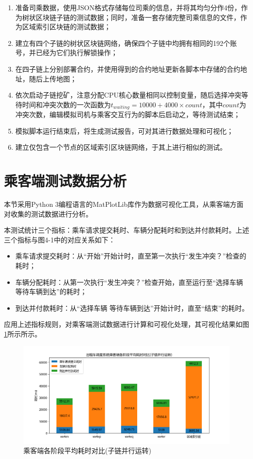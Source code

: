\begin{enumerate}
    \item 准备司乘数据，使用JSON格式存储每位司乘的信息，并将其均匀分作4份，作为树状区块链子链的测试数据；同时，准备一套存储完整司乘信息的文件，作为区域索引区块链的测试数据；
    \item 建立有四个子链的树状区块链网络，确保四个子链中均拥有相同的192个账号，并已经为它们执行解锁操作；
    \item 在四子链上分别部署合约，并使用得到的合约地址更新各脚本中存储的合约地址，随后上传地图；
    \item 依次启动子链挖矿，注意分配CPU核心数量相同以控制变量，随后选择冲突等待时间和冲突次数的一次函数为$t_{waiting} = 10000 + 4000 \times count$，其中$count$为冲突次数，编辑模拟司机与乘客交互行为的脚本后启动之，等待测试结束；
    \item 模拟脚本运行结束后，将生成测试报告，可对其进行数据处理和可视化；
    \item 建立仅包含一个节点的区域索引区块链网络，于其上进行相似的测试。
\end{enumerate}

\section{乘客端测试数据分析}

本节采用Python 3编程语言的MatPlotLib库作为数据可视化工具，从乘客端方面对收集的测试数据进行分析。

本测试统计三个指标：乘车请求提交耗时、车辆分配耗时和到达并付款耗时。上述三个指标与图4-1中的对应关系如下：

\begin{itemize}
    \item 乘车请求提交耗时：从“开始”开始计时，直至第一次执行“发生冲突？”检查的耗时；
    \item 车辆分配耗时：从第一次执行“发生冲突？”检查开始，直至运行至“选择车辆 等待车辆到达”的耗时；
    \item 到达并付款耗时：从“选择车辆 等待车辆到达”开始计时，直至“结束”的耗时。
\end{itemize}

应用上述指标规则，对乘客端测试数据进行计算和可视化处理，其可视化结果如图\ref{乘客端耗时对比(子链并行运行)}所示所示。

\begin{figure}[htbp]
    \centering
    \includegraphics[width=\textwidth]{images/乘客端测试-并行.png}
    \caption{乘客端各阶段平均耗时对比(子链并行运转)}\label{乘客端耗时对比(子链并行运行)} %
\end{figure}

